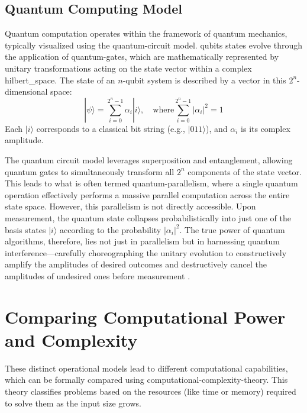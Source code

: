\subsection{Quantum Computing Model}\label{subsec:quantum_rev}
Quantum computation operates within the framework of quantum mechanics, typically visualized using the \gls{quantum-circuit} model. \Glspl{qubit} states evolve through the application of \glspl{quantum-gate}, which are mathematically represented by unitary transformations acting on the state vector within a complex \gls{hilbert_space}. The state of an $n$-\gls{qubit} system is described by a vector in this $2^n$-dimensional space:
\begin{equation}\label{eq:quantum_state_ch4_rev_updated}
    |\psi\rangle = \sum_{i=0}^{2^n-1} \alpha_i|i\rangle, \quad \text{where} \sum_{i=0}^{2^n-1} |\alpha_i|^2 = 1
\end{equation}
Each $|i\rangle$ corresponds to a classical bit string (e.g., $|011\rangle$), and $\alpha_i$ is its complex amplitude.

The quantum circuit model leverages superposition and entanglement, allowing quantum gates to simultaneously transform all $2^n$ components of the state vector. This leads to what is often termed \gls{quantum-parallelism}, where a single quantum operation effectively performs a massive parallel computation across the entire state space. However, this parallelism is not directly accessible. Upon measurement, the quantum state collapses probabilistically into just one of the basis states $|i\rangle$ according to the probability $|\alpha_i|^2$. The true power of quantum algorithms, therefore, lies not just in parallelism but in harnessing quantum \gls{interference}—carefully choreographing the unitary evolution to constructively amplify the amplitudes of desired outcomes and destructively cancel the amplitudes of undesired ones before measurement \parencite{nielsen_chuang_book}.

\section{Comparing Computational Power and Complexity}\label{sec:complexity_classes_rev}

These distinct operational models lead to different computational capabilities, which can be formally compared using \gls{computational-complexity-theory}. This theory classifies problems based on the resources (like time or memory) required to solve them as the input size grows.


